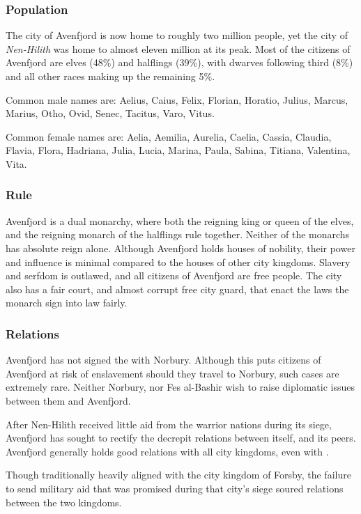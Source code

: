 \subsubsection{Population}

The city of Avenfjord is now home to roughly two million people, yet the city
of \emph{Nen-Hilith} was home to almost eleven million at its peak. Most of
the citizens of Avenfjord are elves (48\%) and halflings (39\%), with dwarves
following third (8\%) and all other races making up the remaining 5\%.

Common male names are: Aelius, Caius, Felix, Florian, Horatio, Julius, Marcus,
Marius, Otho, Ovid, Senec, Tacitus, Varo, Vitus.

Common female names are: Aelia, Aemilia, Aurelia, Caelia, Cassia, Claudia,
Flavia, Flora, Hadriana, Julia, Lucia, Marina, Paula, Sabina, Titiana,
Valentina, Vita.

\subsubsection{Rule}

Avenfjord is a dual monarchy, where both the reigning king or queen of the
elves, and the reigning monarch of the halflings rule together. Neither of
the monarchs has absolute reign alone. Although Avenfjord holds houses of
nobility, their power and influence is minimal compared to the houses of
other city kingdoms. Slavery and serfdom is outlawed, and all citizens of
Avenfjord are free people. The city also has a fair court, and almost corrupt
free city guard, that enact the laws the monarch sign into law fairly.

\subsubsection{Relations}

Avenfjord has not signed the  with Norbury. Although
this puts citizens of Avenfjord at risk of enslavement should they travel to
Norbury, such cases are extremely rare. Neither Norbury, nor Fes al-Bashir wish
to raise diplomatic issues between them and Avenfjord.

After Nen-Hilith received little aid from the warrior nations during its siege,
Avenfjord has sought to rectify the decrepit relations between itself, and its
peers. Avenfjord generally holds good relations with all city kingdoms, even
with .

Though traditionally heavily aligned with the city kingdom of Forsby, the
failure to send military aid that was promised during that city's siege
soured relations between the two kingdoms.
